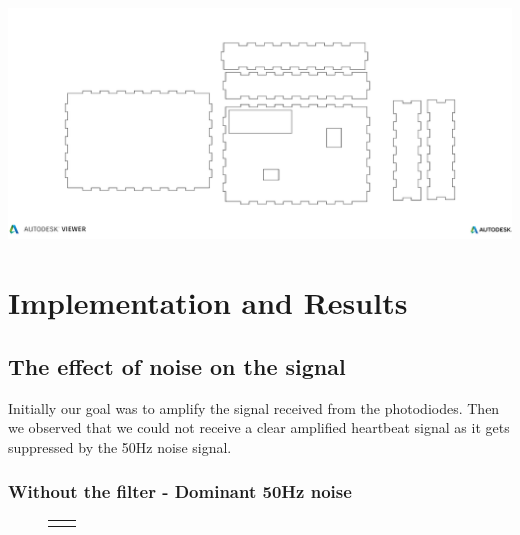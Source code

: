 \documentclass[12pt]{article}
\begin{document}
{\begin{center}
\includegraphics[scale=0.44, angle =90]{lasercut.jpg}
\label{fig:autodesk}

\end{center}

\newpage
\section{Implementation and Results}


\subsection{The effect of noise on the signal}
Initially our goal was to amplify the signal received from the photodiodes. Then we observed that we could not receive a clear amplified heartbeat signal as it gets suppressed by the 50Hz noise signal.

\subsubsection{Without the filter - Dominant 50Hz noise}

\begin{figure}[!htbp]
	\begin{tabular}{cc}
	\centering


\end{tabular}
\end{figure}}
\end{document}
